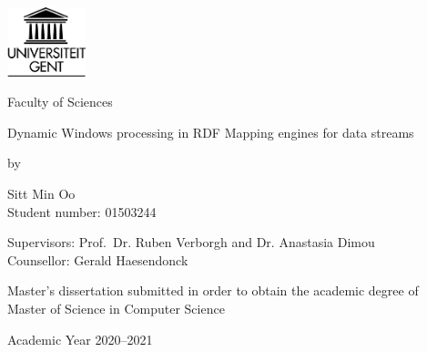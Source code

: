 

\begin{titlepage}

    \setlength{\hoffset}{-1in}
    \setlength{\voffset}{-1in}
    \setlength{\topmargin}{1.5cm}
    \setlength{\headheight}{0.5cm}
    \setlength{\headsep}{1cm}
    \setlength{\oddsidemargin}{3cm}
    \setlength{\evensidemargin}{3cm}
    \setlength{\footskip}{1.5cm}
    \enlargethispage{1cm}

    \fontsize{12pt}{14pt}
    \selectfont

    \begin{center}

    \includegraphics[height=2cm]{fig/ruglogo.png}

    \vspace{0.5cm}

    Faculty of Sciences\\

    \vspace{3.5cm}

    \fontsize{17.28pt}{21pt}
    \selectfont
Dynamic Windows processing in RDF Mapping engines for data streams

    \fontsize{12pt}{14pt}
    \selectfont

    \vspace{.6cm}

    by

    \vspace{.4cm}

Sitt Min Oo\\
Student number: 01503244\\

    \vspace{3.5cm}

Supervisors: Prof.~Dr. Ruben Verborgh and Dr. Anastasia Dimou\\
Counsellor: Gerald Haesendonck\\

    \vspace{2cm}

    Master's dissertation submitted in order to obtain the academic degree of\\
    Master of Science in Computer Science

    \vspace{1cm}

Academic Year 2020--2021

    \end{center}
    \end{titlepage}
